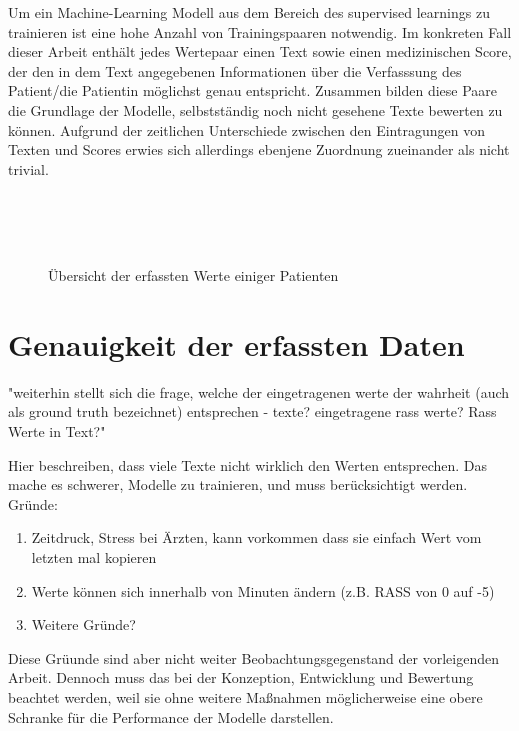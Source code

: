 Um ein Machine-Learning Modell aus dem Bereich des supervised learnings zu trainieren ist eine hohe Anzahl von Trainingspaaren notwendig. Im konkreten Fall dieser Arbeit enthält jedes Wertepaar einen Text sowie einen medizinischen Score, der den in dem Text angegebenen Informationen über die Verfasssung des Patient/die Patientin möglichst genau entspricht. Zusammen bilden diese Paare die Grundlage der Modelle, selbstständig noch nicht gesehene Texte bewerten zu können.
Aufgrund der zeitlichen Unterschiede zwischen den Eintragungen von Texten und Scores erwies sich allerdings ebenjene Zuordnung zueinander als nicht trivial.

\begin{figure}
    \centering
     \\
     \\
     \\
    \caption{Übersicht der erfassten Werte einiger Patienten}
    \label{fig:pat_example_scatterplots}
\end{figure}

\section{Genauigkeit der erfassten Daten}
"weiterhin stellt sich die frage, welche der eingetragenen werte der wahrheit (auch als ground truth bezeichnet) entsprechen - texte? eingetragene rass werte? Rass Werte in Text?"

Hier beschreiben, dass viele Texte nicht wirklich den Werten entsprechen. Das mache es schwerer, Modelle zu trainieren, und muss berücksichtigt werden. Gründe:
\begin{enumerate}
    \item Zeitdruck, Stress bei Ärzten, kann vorkommen dass sie einfach Wert vom letzten mal kopieren
    \item Werte können sich innerhalb von Minuten ändern (z.B. RASS von 0 auf -5)
    \item Weitere Gründe?
\end{enumerate}
Diese Grüunde sind aber nicht weiter Beobachtungsgegenstand der vorleigenden Arbeit. Dennoch muss das bei der Konzeption, Entwicklung und Bewertung beachtet werden, weil sie ohne weitere Maßnahmen möglicherweise eine obere Schranke für die Performance der Modelle darstellen.

